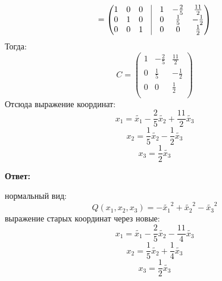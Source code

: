 \documentclass[a4paper,12pt]{article}
\begin{document}
\begin{enumerate}
\[=
\begin{pmatrix}
1 & 0 & 0 & \vrule &  1 &-\frac{2}{5} & \frac{11}{2} \\
0 & 1 & 0 & \vrule & 0 & \frac{1}{5} & -\frac{1}{2} \\
0 & 0 & 1 & \vrule & 0 & 0 & \frac{1}{2} \\
\end{pmatrix}
\]
Тогда:
\[
C
=
\begin{pmatrix}
 1 &-\frac{2}{5} & \frac{11}{2} \\
0 & \frac{1}{5} & -\frac{1}{2} \\
 0 & 0 & \frac{1}{2} \\
\end{pmatrix}
\]
Отсюда выражение координат:
\[
x_1 = \widetilde{x_1} - \frac{2}{5} \widetilde{x_2}  + \frac{11}{2} \widetilde{x_3}
\]
\[
x_2 = \frac{1}{5} \widetilde{x_2} - \frac{1}{2} \widetilde{x_3}
\]
\[
x_3 = \frac{1}{2} \widetilde{x_3}
\]
\end{enumerate}
\begin{center}
\textbf{Ответ: } 

нормальный вид:
\[
Q(x_1, x_2, x_3) = - \widetilde{x_1}^2 + \widetilde{x_2}^2 - \widetilde{x_3}^2
\]
выражение старых координат через новые:
\[
x_1 = \widetilde{x_1} - \frac{2}{5} \widetilde{x_2}  - \frac{11}{4} \widetilde{x_3}
\]
\[
x_2 = \frac{1}{5} \widetilde{x_2} + \frac{1}{4} \widetilde{x_3}
\]
\[
x_3 = \frac{1}{2} \widetilde{x_3}
\]
\end{center}
\clearpage
\end{document}
